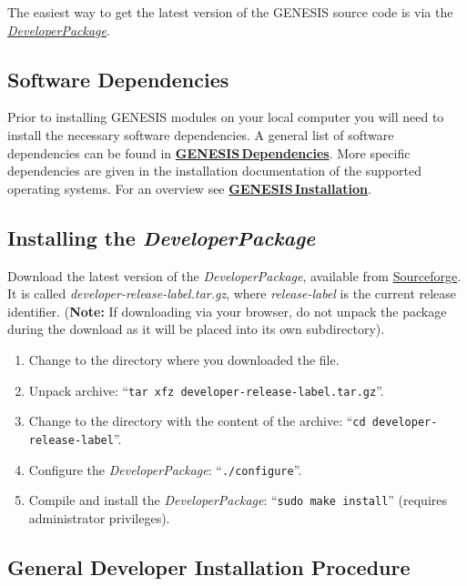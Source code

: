 \documentclass[12pt]{article}
\begin{document}
The easiest way to get the latest version of the GENESIS source code is via the  \href{../developer-package/developer-package.tex}{\it DeveloperPackage}.

\subsection*{Software Dependencies}

Prior to installing GENESIS modules on your local computer you will need to install the necessary software dependencies. A general list of software dependencies can be found in \href{../genesis-dependencies/genesis-dependencies.tex}{\bf GENESIS\,Dependencies}. More specific dependencies are given in the installation documentation of the supported operating systems. For an overview see \href{../genesis-installation/genesis-installation.tex}{\bf GENESIS\,Installation}.

\subsection*{Installing the {\it DeveloperPackage}}

Download the latest version of the {\it DeveloperPackage}, available from \href{http://sourceforge.net/projects/neurospaces/files/}{Sourceforge}.  It is called {\it developer-release-label.tar.gz}, where {\it release-label} is the current release identifier. ({\bf Note:} If downloading via your browser, do not unpack the package during the download as it will be placed into its own subdirectory).
\begin{enumerate}
   \item Change to the directory where you downloaded the file.
   \item Unpack archive: ``{\tt tar xfz developer-release-label.tar.gz}''.
   \item Change to the directory with the content of the archive: ``{\tt cd developer-release-label}''.
   \item Configure the {\it DeveloperPackage}: ``{\tt ./configure}''.
   \item Compile and install the {\it DeveloperPackage}: ``{\tt sudo make install}'' (requires administrator privileges).
\end{enumerate}

\subsection*{General Developer Installation Procedure}
\end{document}
